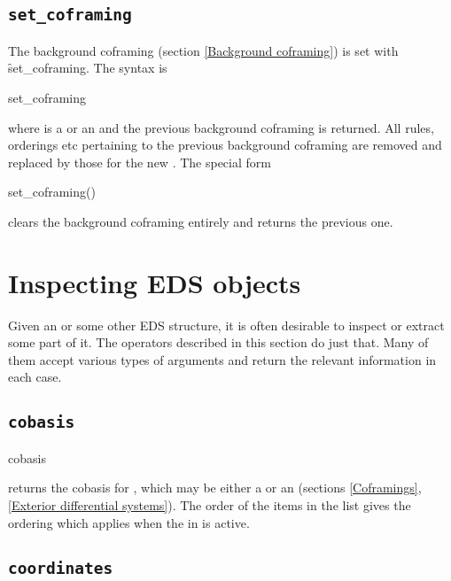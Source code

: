 \subsection{\tt set\_coframing}
\label{set_coframing}

The background coframing (section \ref{Background coframing}) is set with
\f{set\_coframing}. The syntax is
\begin{syntax}
   set\_coframing 
\end{syntax}
where  is a  or an  and the previous
background coframing is returned. All rules, orderings etc pertaining to the
previous background coframing are removed and replaced by those for the new
. The special form
\begin{syntax}
   set\_coframing()
\end{syntax}
clears the background coframing entirely and returns the previous one.



\section{Inspecting EDS objects}
\label{Inspecting EDS objects}

Given an  or some other EDS structure, it is often desirable to
inspect or extract some part of it. The operators described in this section
do just that. Many of them accept various types of arguments and return the
relevant information in each case.

\subsection{\tt cobasis}
\label{cobasis}

\begin{syntax}
	cobasis 
\end{syntax}
returns the cobasis for , which may be either a 
or an  (sections \ref{Coframings}, \ref{Exterior differential
systems}). The order of the items in the list gives the 
ordering which applies when the  in  is active.

\subsection{\tt coordinates}
\label{coordinates}

